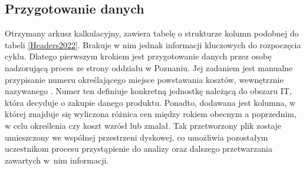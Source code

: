 \subsection{Przygotowanie danych}
Otrzymany arkusz kalkulacyjny, zawiera tabelę o strukturze kolumn podobnej do tabeli \ref{Headers2022}. Brakuje w nim jednak informacji kluczowych do rozpoczęcia cyklu.
Dlatego pierwszym krokiem jest przygotowanie danych przez osobę nadzorującą proces ze strony oddziału w Poznaniu.
Jej zadaniem jest manualne przypisanie numeru określającego miejsce powstawania kosztów, wewnętrznie nazywanego . Numer ten definiuje konkretną jednostkę należącą do obszaru IT, która decyduje o zakupie danego produktu. Ponadto, dodawana jest kolumna, w której znajduje się wyliczona różnica cen między rokiem obecnym a poprzednim, w celu określenia czy koszt wzrósł lub zmalał. Tak przetworzony plik zostaje umieszczony we wspólnej przestrzeni dyskowej, co umożliwia pozostałym uczestnikom procesu przystąpienie do analizy oraz dalszego przetwarzania zawartych w~nim informacji.

\renewcommand{\arraystretch}{1.1} %
\begin{table}[H] %
    \begin{adjustwidth}{-50pt}{-20pt}
        \centering
        \caption{Nagłówki kolumn z arkusza kalkulacyjnego z roku 2022}
        \label{Headers2022}
    \end{adjustwidth}
\end{table}
